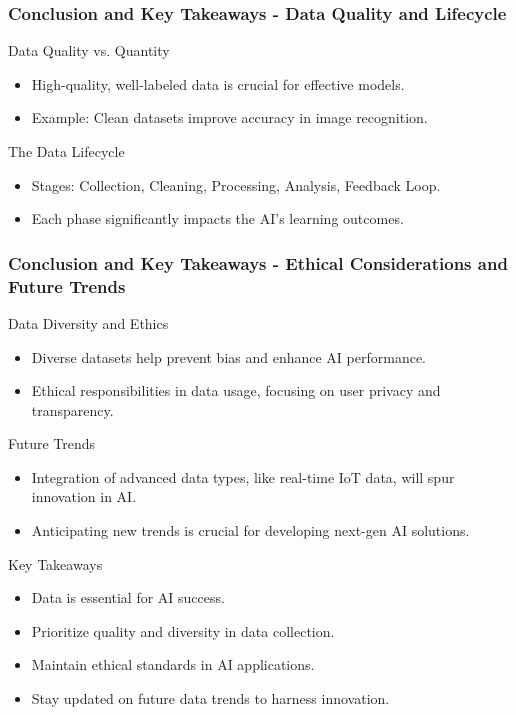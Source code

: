 \documentclass[aspectratio=169]{beamer}
\begin{document}
\begin{frame}[fragile]
    \frametitle{Conclusion and Key Takeaways - Data Quality and Lifecycle}
    \begin{block}{Data Quality vs. Quantity}
        \begin{itemize}
            \item High-quality, well-labeled data is crucial for effective models.
            \item Example: Clean datasets improve accuracy in image recognition.
        \end{itemize}
    \end{block}

    \begin{block}{The Data Lifecycle}
        \begin{itemize}
            \item Stages: Collection, Cleaning, Processing, Analysis, Feedback Loop.
            \item Each phase significantly impacts the AI's learning outcomes.
        \end{itemize}
    \end{block}
\end{frame}

\begin{frame}[fragile]
    \frametitle{Conclusion and Key Takeaways - Ethical Considerations and Future Trends}
    \begin{block}{Data Diversity and Ethics}
        \begin{itemize}
            \item Diverse datasets help prevent bias and enhance AI performance.
            \item Ethical responsibilities in data usage, focusing on user privacy and transparency.
        \end{itemize}
    \end{block}

    \begin{block}{Future Trends}
        \begin{itemize}
            \item Integration of advanced data types, like real-time IoT data, will spur innovation in AI.
            \item Anticipating new trends is crucial for developing next-gen AI solutions.
        \end{itemize}
    \end{block}
    
    \begin{block}{Key Takeaways}
        \begin{itemize}
            \item Data is essential for AI success.
            \item Prioritize quality and diversity in data collection.
            \item Maintain ethical standards in AI applications.
            \item Stay updated on future data trends to harness innovation.
        \end{itemize}
    \end{block}
\end{frame}
\end{document}
